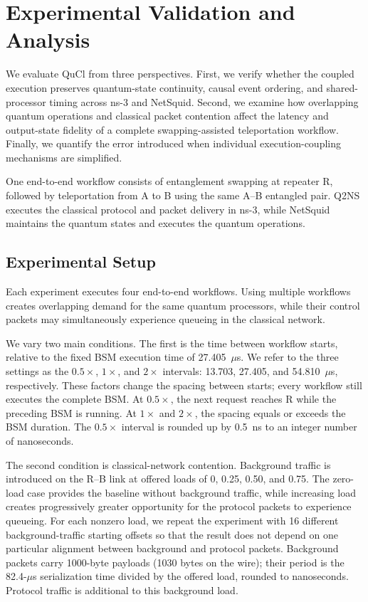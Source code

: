 \section{Experimental Validation and Analysis}
\label{sec:eval}

We evaluate QuCl from three perspectives. First, we verify whether the
coupled execution preserves quantum-state continuity, causal event
ordering, and shared-processor timing across ns-3 and NetSquid. Second,
we examine how overlapping quantum operations and classical packet
contention affect the latency and output-state fidelity of a complete
swapping-assisted teleportation workflow. Finally, we quantify the
error introduced when individual execution-coupling mechanisms are
simplified.

One end-to-end workflow consists of entanglement swapping at repeater R,
followed by teleportation from A to B using the same A--B entangled pair.
Q2NS executes the classical protocol and packet delivery in ns-3,
while NetSquid maintains the quantum states and executes the quantum
operations.

\subsection{Experimental Setup}
\label{subsec:eval-setup}

Each experiment executes four end-to-end workflows. Using multiple
workflows creates overlapping demand for the same quantum processors,
while their control packets may simultaneously experience
queueing in the classical network.

We vary two main conditions. The first is the time between workflow
starts, relative to the fixed BSM execution time of 27.405~$\mu$s.
We refer to the three settings as the $0.5\times$, $1\times$, and
$2\times$ intervals: 13.703, 27.405, and 54.810~$\mu$s, respectively.
These factors change the spacing between starts; every workflow still
executes the complete BSM. At $0.5\times$, the next request reaches R
while the preceding BSM is running. At $1\times$ and $2\times$, the
spacing equals or exceeds the BSM duration. The $0.5\times$ interval is
rounded up by 0.5~ns to an integer number of nanoseconds.

The second condition is classical-network contention. Background traffic
is introduced on the R--B link at offered loads of 0, 0.25, 0.50, and
0.75. The zero-load case provides the baseline without background
traffic, while increasing load creates progressively greater opportunity
for the protocol packets to experience queueing. For each nonzero load,
we repeat the experiment with 16 different background-traffic starting
offsets so that the result does not depend on one particular alignment
between background and protocol packets. Background packets carry
1000-byte payloads (1030 bytes on the wire); their period is the
82.4-$\mu$s serialization time divided by the offered load, rounded
to nanoseconds. Protocol traffic is additional to this background load.


